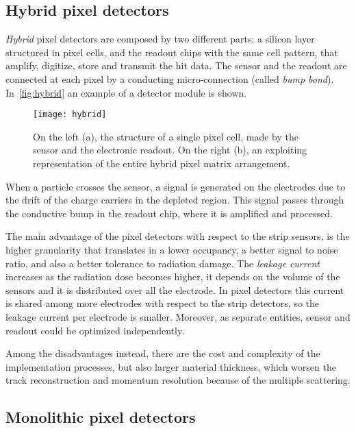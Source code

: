 \subsection{Hybrid pixel detectors}

\textit{Hybrid} pixel detectors are composed by two different parts: a silicon layer structured in pixel cells, and the readout chips with the same cell pattern, that amplify, digitize, store and transmit the hit data. The sensor and the readout are connected at each pixel by a conducting micro-connection (called \emph{bump bond}). In~\autoref{fig:hybrid} an example of a detector module is shown. 

\begin{figure}[h!]
\centering
\texttt{[image: hybrid]}
\caption{On the left (a), the structure of a single pixel cell, made by the sensor and the electronic readout. On the right (b), an exploiting representation of the entire hybrid pixel matrix arrangement.}
\label{fig:hybrid}
\end{figure}

When a particle crosses the sensor, a signal is generated on the electrodes due to the drift of the charge carriers in the depleted region. This signal passes through the conductive bump in the readout chip, where it is amplified and processed.

The main advantage of the pixel detectors with respect to the strip sensors, is the higher granularity that translates in a lower occupancy, a better signal to noise ratio, and also a better tolerance to radiation damage. The \emph{leakage current} increases as the radiation dose becomes higher, it depends on the volume of the sensors and it is distributed over all the electrode. In pixel detectors this current is shared among more electrodes with respect to the strip detectors, so the leakage current per electrode is smaller. Moreover, as separate entities, sensor and readout could be optimized independently.

Among the disadvantages instead, there are the cost and complexity of the implementation processes, but also larger material thickness, which worsen the track reconstruction and momentum resolution because of the multiple scattering.


\subsection{Monolithic pixel detectors}

